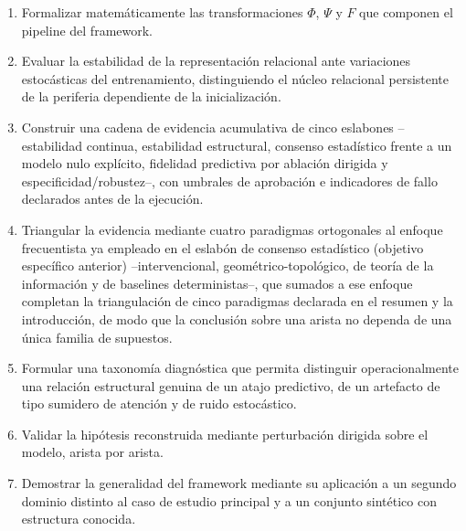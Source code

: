 \begin{enumerate}
\item Formalizar matemáticamente las transformaciones $\Phi$, $\Psi$ y $F$ que componen el pipeline del framework.
\item Evaluar la estabilidad de la representación relacional ante variaciones estocásticas del entrenamiento, distinguiendo el núcleo relacional persistente de la periferia dependiente de la inicialización.
\item Construir una cadena de evidencia acumulativa de cinco eslabones --estabilidad continua, estabilidad estructural, consenso estadístico frente a un modelo nulo explícito, fidelidad predictiva por ablación dirigida y especificidad/robustez--, con umbrales de aprobación e indicadores de fallo declarados antes de la ejecución.
\item Triangular la evidencia mediante cuatro paradigmas ortogonales al enfoque frecuentista ya empleado en el eslabón de consenso estadístico (objetivo específico anterior) --intervencional, geométrico-topológico, de teoría de la información y de baselines deterministas--, que sumados a ese enfoque completan la triangulación de cinco paradigmas declarada en el resumen y la introducción, de modo que la conclusión sobre una arista no dependa de una única familia de supuestos.
\item Formular una taxonomía diagnóstica que permita distinguir operacionalmente una relación estructural genuina de un atajo predictivo, de un artefacto de tipo sumidero de atención y de ruido estocástico.
\item Validar la hipótesis reconstruida mediante perturbación dirigida sobre el modelo, arista por arista.
\item Demostrar la generalidad del framework mediante su aplicación a un segundo dominio distinto al caso de estudio principal y a un conjunto sintético con estructura conocida.
\end{enumerate}
